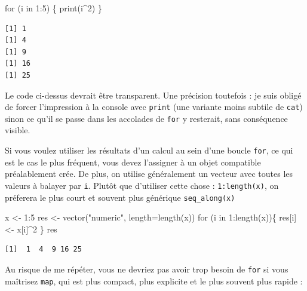 \documentclass[
  letterpaper,
  DIV=11,
  numbers=noendperiod]{scrreprt}
\newenvironment{Shaded}{\begin{snugshade}}{\end{snugshade}}
\newcommand{\AttributeTok}[1]{\textcolor[rgb]{0.40,0.45,0.13}{#1}}
\newcommand{\ControlFlowTok}[1]{\textcolor[rgb]{0.00,0.23,0.31}{#1}}
\newcommand{\DecValTok}[1]{\textcolor[rgb]{0.68,0.00,0.00}{#1}}
\newcommand{\FunctionTok}[1]{\textcolor[rgb]{0.28,0.35,0.67}{#1}}
\newcommand{\NormalTok}[1]{\textcolor[rgb]{0.00,0.23,0.31}{#1}}
\newcommand{\OtherTok}[1]{\textcolor[rgb]{0.00,0.23,0.31}{#1}}
\newcommand{\SpecialCharTok}[1]{\textcolor[rgb]{0.37,0.37,0.37}{#1}}
\newcommand{\StringTok}[1]{\textcolor[rgb]{0.13,0.47,0.30}{#1}}
\begin{document}
\begin{Shaded}
\begin{Highlighting}[]
\ControlFlowTok{for}\NormalTok{ (i }\ControlFlowTok{in} \DecValTok{1}\SpecialCharTok{:}\DecValTok{5}\NormalTok{) \{}
  \FunctionTok{print}\NormalTok{(i}\SpecialCharTok{\^{}}\DecValTok{2}\NormalTok{)}
\NormalTok{\}}
\end{Highlighting}
\end{Shaded}

\begin{verbatim}
[1] 1
[1] 4
[1] 9
[1] 16
[1] 25
\end{verbatim}

Le code ci-dessus devrait être transparent. Une précision toutefois : je
suis obligé de forcer l'impression à la console avec \texttt{print} (une
variante moins subtile de \texttt{cat}) sinon ce qu'il se passe dans les
accolades de \texttt{for} y resterait, sans conséquence visible.

Si vous voulez utiliser les résultats d'un calcul au sein d'une boucle
\texttt{for}, ce qui est le cas le plus fréquent, vous devez l'assigner
à un objet compatible préalablement crée. De plus, on utilise
généralement un vecteur avec toutes les valeurs à balayer par
\texttt{i}. Plutôt que d'utiliser cette chose : \texttt{1:length(x)}, on
préferera le plus court et souvent plus générique \texttt{seq\_along(x)}

\begin{Shaded}
\begin{Highlighting}[]
\NormalTok{x }\OtherTok{\textless{}{-}} \DecValTok{1}\SpecialCharTok{:}\DecValTok{5}
\NormalTok{res }\OtherTok{\textless{}{-}} \FunctionTok{vector}\NormalTok{(}\StringTok{"numeric"}\NormalTok{, }\AttributeTok{length=}\FunctionTok{length}\NormalTok{(x))}
\ControlFlowTok{for}\NormalTok{ (i }\ControlFlowTok{in} \DecValTok{1}\SpecialCharTok{:}\FunctionTok{length}\NormalTok{(x))\{}
\NormalTok{  res[i] }\OtherTok{\textless{}{-}}\NormalTok{ x[i]}\SpecialCharTok{\^{}}\DecValTok{2}
\NormalTok{\}}
\NormalTok{res}
\end{Highlighting}
\end{Shaded}

\begin{verbatim}
[1]  1  4  9 16 25
\end{verbatim}

Au risque de me répéter, vous ne devriez pas avoir trop besoin de
\texttt{for} si vous maîtrisez \texttt{map}, qui est plus compact, plus
explicite et le plus souvent plus rapide :
\end{document}

